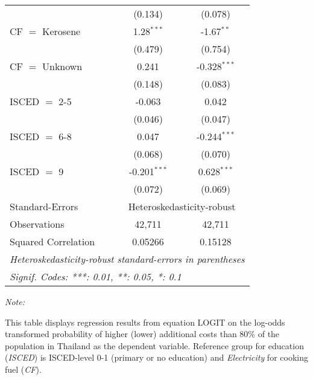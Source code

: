 \begin{table}[htbp!]
\begin{adjustbox}{width = 1\textwidth, max height = 0.95\textheight, center}
\begin{threeparttable}[b]
\begin{tabular}{lcc}
                                 & (0.134)        & (0.078)\\   
            CF $=$ Kerosene      & 1.28$^{***}$   & -1.67$^{**}$\\   
                                 & (0.479)        & (0.754)\\   
            CF $=$ Unknown       & 0.241          & -0.328$^{***}$\\   
                                 & (0.148)        & (0.083)\\   
            ISCED $=$ 2-5        & -0.063         & 0.042\\   
                                 & (0.046)        & (0.047)\\   
            ISCED $=$ 6-8        & 0.047          & -0.244$^{***}$\\   
                                 & (0.068)        & (0.070)\\   
            ISCED $=$ 9          & -0.201$^{***}$ & 0.628$^{***}$\\   
                                 & (0.072)        & (0.069)\\   
            \midrule 
            Standard-Errors & \multicolumn{2}{c}{Heteroskedasticity-robust} \\ 
            Observations         & 42,711         & 42,711\\  
            Squared Correlation  & 0.05266        & 0.15128\\  
            \midrule \midrule
            \multicolumn{3}{l}{\emph{Heteroskedasticity-robust standard-errors in parentheses}}\\
            \multicolumn{3}{l}{\emph{Signif. Codes: ***: 0.01, **: 0.05, *: 0.1}}\\
         \end{tabular}
         
         \begin{tablenotes}\item \medskip \textit{Note:}
            \item This table displays regression results from equation LOGIT on the log-odds transformed probability of higher (lower) additional costs than 80\% of the population in Thailand as the dependent variable. Reference group for education (\textit{ISCED}) is ISCED-level 0-1 (primary or no education) and \textit{Electricity} for cooking fuel (\textit{CF}).
         \end{tablenotes}
      \end{threeparttable}
   \end{adjustbox}
\end{table}


